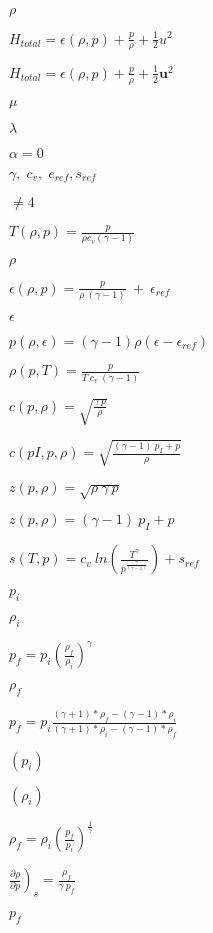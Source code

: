 \documentclass{article}
\begin{document}
$\rho $
\pagebreak

$H_{total} = \epsilon (\rho, p) + \frac{p}{\rho} + \frac{1}{2}u^2 $
\pagebreak

$H_{total} = \epsilon (\rho, p) + \frac{p}{\rho} + \frac{1}{2}\bm{u}^2 $
\pagebreak

$ \mu $
\pagebreak

$ \lambda $
\pagebreak

$\alpha = 0 $
\pagebreak

$ \gamma, \; c_v, \; e_{ref}, s_{ref}$
\pagebreak

$ \neq 4$
\pagebreak

$ T(\rho, p) = \frac{p}{\rho c_v (\gamma-1)}$
\pagebreak

$\rho$
\pagebreak

$ \epsilon (\rho, p) = \frac{p}{\rho \ (\gamma-1)} \ + \ \epsilon_{ref}$
\pagebreak

$\epsilon$
\pagebreak

$ p(\rho, \epsilon) = (\gamma-1)\rho(\epsilon - \epsilon_{ref}) $
\pagebreak

$ \rho(p, T) = \frac{p}{T \ c_v \ (\gamma-1)}\ $
\pagebreak

$ c(p, \rho) = \sqrt{ \frac{\gamma \ p}{\rho}} $
\pagebreak

$ c(pI, p, \rho) = \sqrt{ \frac{(\gamma-1) \ p_I + p}{\rho}} $
\pagebreak

$ z(p, \rho) = \sqrt{ \rho \ \gamma \ p } $
\pagebreak

$ z(p, \rho) = (\gamma-1) \ p_I + p $
\pagebreak

$ s(T, p) = c_v \ ln \left( \frac{T^\gamma} { p^\frac{\gamma}{(\gamma-1)} } \right)+s_{ref} $
\pagebreak

$ p_i $
\pagebreak

$ \rho_i $
\pagebreak

$ p_f = p_i \left( \frac{\rho_f}{\rho_i} \right) ^\gamma $
\pagebreak

$ \rho_f $
\pagebreak

$ p_f = p_i \frac{ (\gamma+1)*\rho_f - (\gamma-1)*\rho_i }{ (\gamma+1)*\rho_i-(\gamma-1)*\rho_f } $
\pagebreak

$ (p_i) $
\pagebreak

$ (\rho_i ) $
\pagebreak

$ \rho_f = \rho_i \left( \frac{p_f}{ p_i}\right) ^\frac{1}{\gamma} $
\pagebreak

$ \left. \frac{\partial \rho}{\partial p} \right)_s = \frac{\rho_f}{ \gamma \ p_f} $
\pagebreak

$ p_f $
\pagebreak
\end{document}
